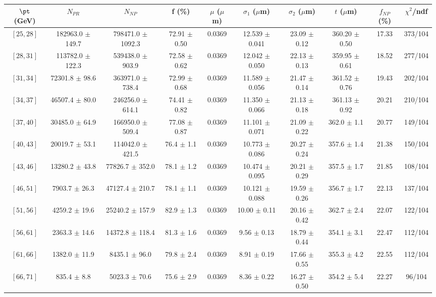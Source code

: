 \begin{tabular}{c||c|c|c|c|c|c|c||c|c}
$\pt$ (GeV) & $N_{PR}$ & $N_{NP}$ & f (\%) & $\mu$ ($\mu$m) & $\sigma_1$ ($\mu$m) & $\sigma_2$ ($\mu$m)  & $t$ ($\mu$m) & $f_{NP}$ (\%) & $\chi^2$/ndf \\
\hline
$[25, 28]$ & 182963.0 $\pm$ 149.7 & 798471.0 $\pm$ 1092.3 & 72.91 $\pm$ 0.50 & 0.0369 & 12.539 $\pm$ 0.041 & 23.09 $\pm$ 0.12 & 360.20 $\pm$ 0.50 & 17.33 & 373/104\\
$[28, 31]$ & 113782.0 $\pm$ 122.3 & 539438.0 $\pm$ 903.9 & 72.58 $\pm$ 0.62 & 0.0369 & 12.042 $\pm$ 0.050 & 22.13 $\pm$ 0.13 & 359.95 $\pm$ 0.61 & 18.52 & 277/104\\
$[31, 34]$ & 72301.8 $\pm$ 98.6 & 363971.0 $\pm$ 738.4 & 72.99 $\pm$ 0.68 & 0.0369 & 11.589 $\pm$ 0.056 & 21.47 $\pm$ 0.14 & 361.52 $\pm$ 0.76 & 19.43 & 202/104\\
$[34, 37]$ & 46507.4 $\pm$ 80.0 & 246256.0 $\pm$ 614.1 & 74.41 $\pm$ 0.82 & 0.0369 & 11.350 $\pm$ 0.066 & 21.13 $\pm$ 0.18 & 361.13 $\pm$ 0.92 & 20.21 & 210/104\\
$[37, 40]$ & 30485.0 $\pm$ 64.9 & 166950.0 $\pm$ 509.4 & 77.08 $\pm$ 0.87 & 0.0369 & 11.101 $\pm$ 0.071 & 21.09 $\pm$ 0.22 & 362.0 $\pm$ 1.1 & 20.77 & 149/104\\
$[40, 43]$ & 20019.7 $\pm$ 53.1 & 114042.0 $\pm$ 421.5 & 76.4 $\pm$ 1.1 & 0.0369 & 10.773 $\pm$ 0.086 & 20.27 $\pm$ 0.24 & 357.6 $\pm$ 1.4 & 21.38 & 150/104\\
$[43, 46]$ & 13280.2 $\pm$ 43.8 & 77826.7 $\pm$ 352.0 & 78.1 $\pm$ 1.2 & 0.0369 & 10.474 $\pm$ 0.095 & 20.21 $\pm$ 0.29 & 357.5 $\pm$ 1.7 & 21.85 & 108/104\\
$[46, 51]$ & 7903.7 $\pm$ 26.3 & 47127.4 $\pm$ 210.7 & 78.1 $\pm$ 1.1 & 0.0369 & 10.121 $\pm$ 0.088 & 19.59 $\pm$ 0.26 & 356.7 $\pm$ 1.7 & 22.13 & 137/104\\
$[51, 56]$ & 4259.2 $\pm$ 19.6 & 25240.2 $\pm$ 157.9 & 82.9 $\pm$ 1.3 & 0.0369 & 10.00 $\pm$ 0.11 & 20.16 $\pm$ 0.42 & 362.7 $\pm$ 2.4 & 22.07 & 122/104\\
$[56, 61]$ & 2363.3 $\pm$ 14.6 & 14372.8 $\pm$ 118.4 & 81.3 $\pm$ 1.6 & 0.0369 & 9.56 $\pm$ 0.13 & 18.79 $\pm$ 0.44 & 354.1 $\pm$ 3.1 & 22.47 & 112/104\\
$[61, 66]$ & 1382.0 $\pm$ 11.9 & 8435.1 $\pm$ 96.0 & 79.8 $\pm$ 2.4 & 0.0369 & 8.91 $\pm$ 0.19 & 17.66 $\pm$ 0.55 & 355.3 $\pm$ 4.2 & 22.55 & 112/104\\
$[66, 71]$ & 835.4 $\pm$ 8.8 & 5023.3 $\pm$ 70.6 & 75.6 $\pm$ 2.9 & 0.0369 & 8.36 $\pm$ 0.22 & 16.27 $\pm$ 0.50 & 354.2 $\pm$ 5.4 & 22.27 & 96/104\\

\end{tabular}
